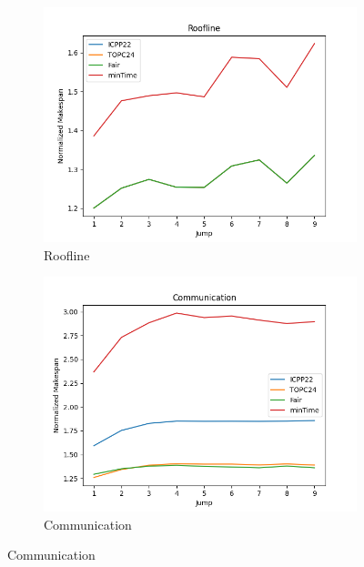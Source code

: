 \documentclass{article}
\begin{document}
\begin{figure}[htbp]
\centering
\begin{subfigure}[b]{0.32\textwidth}\includegraphics[width=\textwidth]{Results/Jump/Jump_Roofline}\caption{Roofline}\label{fig:lines_figures_Jump_Roofline}\end{subfigure}
\hfill
\begin{subfigure}[b]{0.32\textwidth}\includegraphics[width=\textwidth]{Results/Jump/Jump_Communication}\caption{Communication}\label{fig:lines_figures_Jump_Communication}\end{subfigure}
\hfill

\end{figure}
\end{document}
